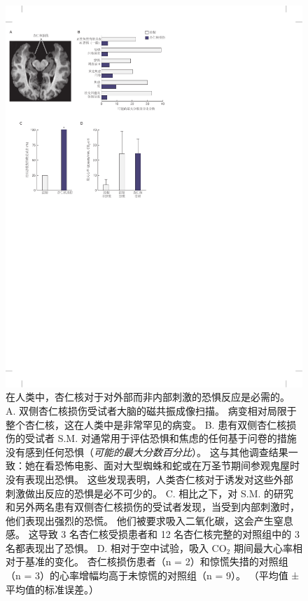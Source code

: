 \begin{figure}[htbp]
	\centering
	\includegraphics[width=1.0\linewidth]{chap42/fig_42_6}
	\caption{在人类中，杏仁核对于对外部而非内部刺激的恐惧反应是必需的。
		A. 双侧杏仁核损伤受试者大脑的磁共振成像扫描。
		病变相对局限于整个杏仁核，这在人类中是非常罕见的病变。
		B. 患有双侧杏仁核损伤的受试者 S.M. 对通常用于评估恐惧和焦虑的任何基于问卷的措施没有感到任何恐惧（\textit{可能的最大分数百分比}）。
		这与其他调查结果一致：她在看恐怖电影、面对大型蜘蛛和蛇或在万圣节期间参观鬼屋时没有表现出恐惧。
		这些发现表明，人类杏仁核对于诱发对这些外部刺激做出反应的恐惧是必不可少的。
		C. 相比之下，对 S.M. 的研究和另外两名患有双侧杏仁核损伤的受试者发现，当受到内部刺激时，他们表现出强烈的恐慌。
		他们被要求吸入二氧化碳，这会产生窒息感。
		这导致 3 名杏仁核受损患者和 12 名杏仁核完整的对照组中的 3 名都表现出了恐惧。
		D. 相对于空中试验，吸入 CO$_2$ 期间最大心率相对于基准的变化。
		杏仁核损伤患者（n = 2）和惊慌失措的对照组（n = 3）的心率增幅均高于未惊慌的对照组（n = 9）。
		（平均值 ± 平均值的标准误差。）\cite{feinstein2011human} }
	\label{fig:42_6}
\end{figure}


